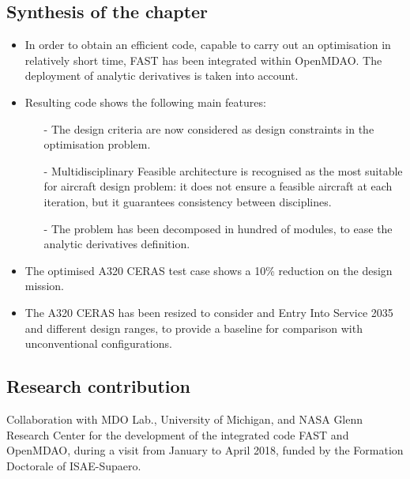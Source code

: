 \begin{mdframed}[hidealllines=true,backgroundcolor=blue!20]
	\section*{Synthesis of the chapter}
	
	\begin{itemize}
		
		\item In order to obtain an efficient code, capable to carry out an optimisation in relatively short time, FAST has been integrated within OpenMDAO. The deployment of analytic derivatives is taken into account. 
		
		\item Resulting code shows the following main features: 
		\begin{itemize}
			
			\item[-] The design criteria are now considered as design constraints in the optimisation problem. 
			
			\item[-] Multidisciplinary Feasible architecture is recognised as the most suitable for aircraft design problem: it does not ensure a feasible aircraft at each iteration, but it guarantees consistency between disciplines. 
			
			\item[-] The problem has been decomposed in hundred of modules, to ease the analytic derivatives definition.
		\end{itemize}
	
		\item The optimised A320 CERAS test case shows a 10\% reduction on the design mission. 
		
		\item The A320 CERAS has been resized to consider and Entry Into Service 2035 and different design ranges, to provide a baseline for comparison with unconventional configurations. 
		
	\end{itemize}
	
\end{mdframed}

\begin{mdframed}[hidealllines=true,backgroundcolor=green!20]
	\section*{Research contribution }
	Collaboration with MDO Lab., University of Michigan, and NASA Glenn Research Center for the development of the integrated code FAST and OpenMDAO, during a visit from January to April 2018, funded by the Formation Doctorale of ISAE-Supaero. 
\end{mdframed}